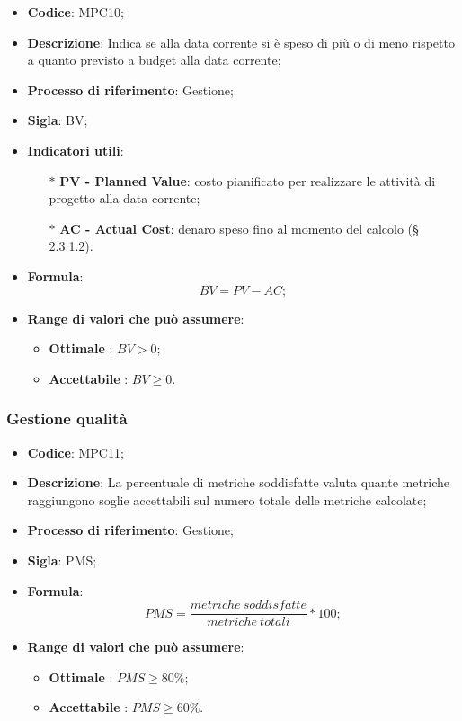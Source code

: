 \vspace{-1cm}
\begin{itemize}
	\item \textbf{Codice}: MPC10;
	\item \textbf{Descrizione}: Indica se alla data corrente si è speso di più o di meno rispetto a quanto previsto a budget alla data corrente;
	\item \textbf{Processo di riferimento}: Gestione;
	\item \textbf{Sigla}: BV;
	\item \textbf{Indicatori utili}: 
		\begin{itemize}
			\item[$\ast$] \textbf{PV - Planned Value}: costo pianificato per realizzare le attività di progetto alla data corrente;
			\item[$\ast$] \textbf{AC - Actual Cost}: denaro speso fino al momento del calcolo (§ 2.3.1.2).
		\end{itemize}
	\item \textbf{Formula}: \[ BV = PV - AC;\]
	\item \textbf{Range di valori che può assumere}: 
		\begin{itemize}
			\item \textbf{Ottimale} : $BV > 0$;
			\item \textbf{Accettabile} : $BV \geq 0$.
		\end{itemize}
\end{itemize}

\subsubsection{Gestione qualità}
\vspace{-1cm}
\begin{itemize}
	\item \textbf{Codice}: MPC11;
	\item \textbf{Descrizione}: La percentuale di metriche soddisfatte valuta quante metriche raggiungono soglie accettabili sul numero totale delle metriche calcolate;
	\item \textbf{Processo di riferimento}: Gestione;
	\item \textbf{Sigla}: PMS;
	\item \textbf{Formula}: \[ PMS = \frac{metriche \ soddisfatte}{metriche \ totali} \ast 100;\]
	\item \textbf{Range di valori che può assumere}: 
		\begin{itemize}
			\item \textbf{Ottimale} : $PMS \geq 80 \%$;
			\item \textbf{Accettabile} : $PMS \geq 60 \%$.
		\end{itemize}
\end{itemize}
